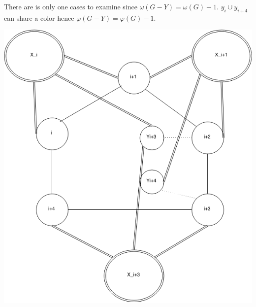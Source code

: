 \documentclass[12pt]{article}
\begin{document}
\begin{minipage}{0.5\textwidth}%
	 There are is only one cases to examine since $\omega(G - Y) = \omega(G) - 1 $. $y_{i} \cup y_{i+4}$ can share a color hence $\varphi(G - Y) = \varphi(G) - 1$.
\end{minipage}
\hfill
\begin{minipage}{0.5\textwidth}\raggedleft
	\includegraphics[width=\linewidth]{Yi3-Yi4.png}
\end{minipage}
\end{document}
